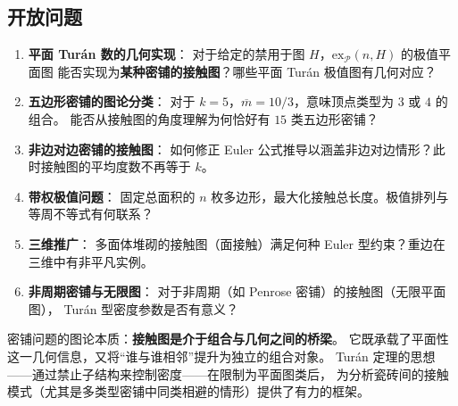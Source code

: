 \documentclass[12pt,a4paper]{article}
\theoremstyle{plain}
\theoremstyle{definition}
\theoremstyle{remark}
\begin{document}
\subsection{开放问题}

\begin{enumerate}[label=\textbf{Q\arabic*}.]

    \item \textbf{平面 Tur\'an 数的几何实现}：
    对于给定的禁用于图 $H$，$\mathrm{ex}_{\mathcal{P}}(n, H)$ 的极值平面图
    能否实现为\textbf{某种密铺的接触图}？哪些平面 Tur\'an 极值图有几何对应？
    
    \item \textbf{五边形密铺的图论分类}：
    对于 $k=5$，$\overline{m} = 10/3$，意味顶点类型为 $3$ 或 $4$ 的组合。
    能否从接触图的角度理解为何恰好有 $15$ 类五边形密铺？
    
    \item \textbf{非边对边密铺的接触图}：
    如何修正 Euler 公式推导以涵盖非边对边情形？此时接触图的平均度数不再等于 $k$。
    
    \item \textbf{带权极值问题}：
    固定总面积的 $n$ 枚多边形，最大化接触总长度。极值排列与等周不等式有何联系？
    
    \item \textbf{三维推广}：
    多面体堆砌的接触图（面接触）满足何种 Euler 型约束？重边在三维中有非平凡实例。
    
    \item \textbf{非周期密铺与无限图}：
    对于非周期（如 Penrose 密铺）的接触图（无限平面图），
    Tur\'an 型密度参数是否有意义？

\end{enumerate}

\vspace{12pt}
\begin{tcolorbox}[title=核心洞察]
密铺问题的图论本质：\textbf{接触图是介于组合与几何之间的桥梁}。
它既承载了平面性这一几何信息，又将``谁与谁相邻''提升为独立的组合对象。
Tur\'an 定理的思想——通过禁止子结构来控制密度——在限制为平面图类后，
为分析瓷砖间的接触模式（尤其是多类型密铺中同类相避的情形）提供了有力的框架。
\end{tcolorbox}
\end{document}
